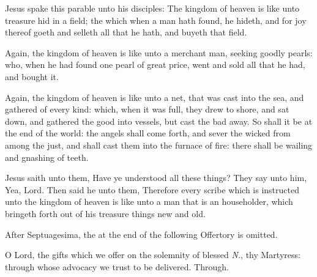 \vspace{-0.5\baselineskip}


\vspace{-0.25\baselineskip}

 Jesus spake this parable unto his disciples: The kingdom of heaven is like unto treasure hid in a field; the which when a man hath found, he hideth, and for joy thereof goeth and selleth all that he hath, and buyeth that field.

Again, the kingdom of heaven is like unto a merchant man, seeking goodly pearls: who, when he had found one pearl of great price, went and sold all that he had, and bought it.

Again, the kingdom of heaven is like unto a net, that was cast into the sea, and gathered of every kind: which, when it was full, they drew to shore, and sat down, and gathered the good into vessels, but cast the bad away. So shall it be at the end of the world: the angels shall come forth, and sever the wicked from among the just, and shall cast them into the furnace of fire: there shall be wailing and gnashing of teeth.

Jesus saith unto them, Have ye understood all these things? They say unto him, Yea, Lord. Then said he unto them, Therefore every scribe which is instructed unto the kingdom of heaven is like unto a man that is an householder, which bringeth forth out of his treasure things new and old.

\begin{rubric}
	After Septuagesima, the  at the end of the following Offertory is omitted.
\end{rubric}

\vspace{-0.5\baselineskip}

\secret

\vspace{-0.25\baselineskip}

 O Lord, the gifts which we offer on the solemnity of blessed \textit{N.}, thy Martyress: through whose advocacy we trust to be delivered. Through.\\


